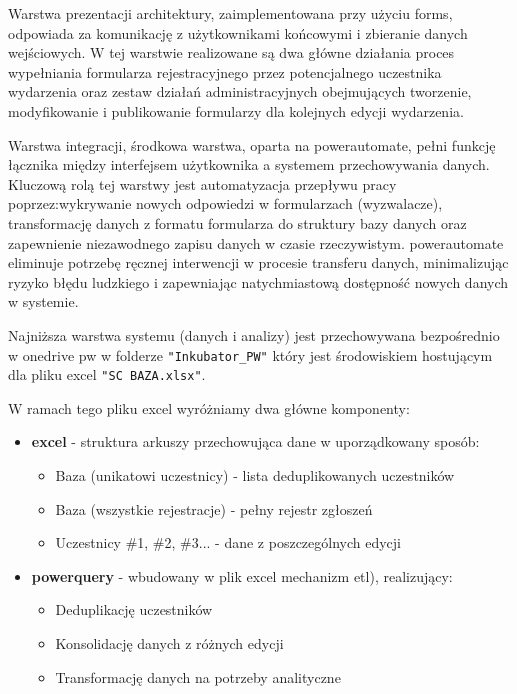 Warstwa prezentacji architektury, zaimplementowana przy użyciu \gls{forms}, odpowiada za komunikację z użytkownikami końcowymi i zbieranie danych wejściowych. W tej warstwie realizowane są dwa główne działania proces wypełniania formularza rejestracyjnego przez potencjalnego uczestnika wydarzenia oraz 
zestaw działań administracyjnych obejmujących tworzenie, modyfikowanie i publikowanie formularzy dla kolejnych edycji wydarzenia.

Warstwa integracji, środkowa warstwa, oparta na \gls{powerautomate}, pełni funkcję łącznika między interfejsem użytkownika a systemem przechowywania danych. Kluczową rolą tej warstwy jest automatyzacja przepływu pracy poprzez:wykrywanie nowych odpowiedzi w formularzach (wyzwalacze), transformację danych z formatu formularza do struktury bazy danych oraz zapewnienie niezawodnego zapisu danych w czasie rzeczywistym. \gls{powerautomate} eliminuje potrzebę ręcznej interwencji w procesie transferu danych, minimalizując ryzyko błędu ludzkiego i zapewniając natychmiastową dostępność nowych danych w systemie.


Najniższa warstwa systemu (danych i analizy) jest przechowywana bezpośrednio w \gls{onedrive} \gls{pw} w folderze \texttt{"Inkubator\_PW"} który jest środowiskiem hostującym dla pliku \gls{excel} \texttt{"SC BAZA.xlsx"}.

W ramach tego pliku \gls{excel} wyróżniamy dwa główne komponenty:
\begin{itemize}
\item \textbf{\gls{excel}} - struktura arkuszy przechowująca dane w uporządkowany sposób:
\begin{itemize}
\item Baza (unikatowi uczestnicy) - lista deduplikowanych uczestników
\item Baza (wszystkie rejestracje) - pełny rejestr zgłoszeń
\item Uczestnicy \#1, \#2, \#3... - dane z poszczególnych edycji
\end{itemize}
\item \textbf{\gls{powerquery}} - wbudowany w plik \gls{excel} mechanizm \gls{etl}), realizujący:
\begin{itemize}
\item Deduplikację uczestników
\item Konsolidację danych z różnych edycji
\item Transformację danych na potrzeby analityczne
\end{itemize}
\end{itemize}

